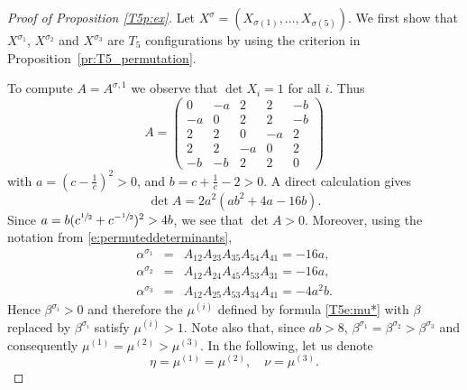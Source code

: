 \documentclass[titlepage]{amsart}
\numberwithin{equation}{section}
\theoremstyle{plain}
\theoremstyle{definition}
\theoremstyle{remark}
\begin{document}
\begin{proof}[Proof of Proposition \ref{T5p:ex}]
Let $X^\sigma = (X_{\sigma(1)}, \ldots, X_{\sigma(5)})$. 
We first show that $X^{\sigma_1}$, $X^{\sigma_2}$ and $X^{\sigma_3}$ are
$T_5$ configurations by using the criterion in Proposition~\ref{pr:T5_permutation}.



To compute $A = A^{\sigma, 1}$ we observe that 
 $\det X_i=1$ for all $i$. 
  Thus
\begin{equation*}
A=\begin{pmatrix}
	0&-a&2&2&-b\\ -a&0&2&2&-b\\2&2&0&-a&2\\2&2&-a&0&2\\-b&-b&2&2&0
\end{pmatrix}	
\end{equation*}
with $a=(c-\tfrac1c)^2>0$, and $b=c+\tfrac1c-2>0$. 
A direct calculation gives
$$
\det A=2a^2(ab^2+4a-16b).
$$
Since $a=b(c^{\sfrac12}+c^{-\sfrac12})^2> 4b$, we see that $\det A>0$. 
Moreover, using the notation from \eqref{e:permuteddeterminants},
\begin{eqnarray*} \alpha^{\sigma_1} &=& A_{12} A_{23} A_{35} A_{54} A_{41} = - 16 a, \\
 \alpha^{\sigma_2} &=& A_{12} A_{24} A_{45} A_{53} A_{31} = - 16 a, \\
  \alpha^{\sigma_3} &=& A_{12} A_{25} A_{53} A_{34} A_{41} = - 4 a^2 b.
  \end{eqnarray*}
Hence $\beta^{\sigma_i}>0$ and therefore the $\mu^{(i)}$ defined by formula \eqref{T5e:mu*}  with $\beta$ replaced by
$\beta^{\sigma_i}$ satisfy $\mu^{(i)}>1$. 
Note also that, since $ab>8$, $\beta^{\sigma_1}=\beta^{\sigma_2}>\beta^{\sigma_3}$ 
and consequently $\mu^{(1)}=\mu^{(2)}>\mu^{(3)}$. In  the following, let us denote
$$
\eta=\mu^{(1)}=\mu^{(2)},\quad \nu=\mu^{(3)}.
$$


\end{proof}
\end{document}
